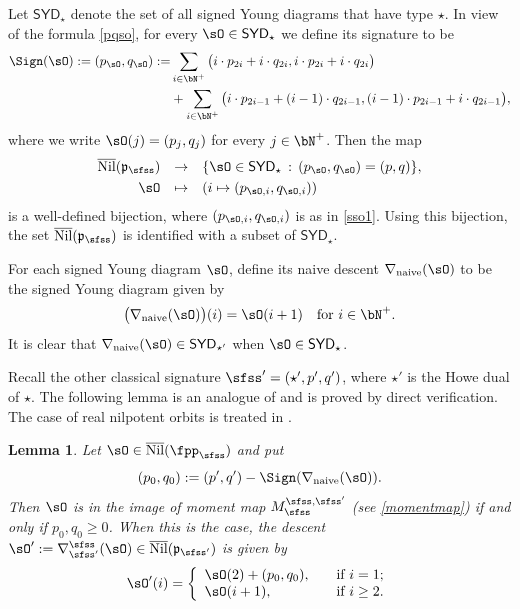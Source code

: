 \documentclass[11pt,a4paper]{amsart}
\def\SYD{{\mathsf{SYD}}}
\newcommand{\p}{\mathfrak p}
\def\DD{\nabla}
\newcommand{\be}{\begin {equation}}
\newcommand{\ee}{\end {equation}}
\numberwithin{equation}{section}
\newtheorem{lem}[thm]{Lemma}
\theoremstyle{remark}
\def\Nil{\overline{\mathrm{Nil}}}
\def\DDn{\DD_{\mathrm{naive}}}
\def\SYD{{\mathsf{SYD}}}
\begin{document}
Let $\SYD_{\star}$ denote the set of all signed Young diagrams that have type $\star$. 
In view of the formula \eqref{pqso}, for every $\sO\in \SYD_{\star}$ we define its signature to be
\be\label{signso}
  \begin{split}
    \Sign(\sO) :=(p_\sO,q_\sO):= &
    \sum_{i\in \bN^{+}} \big(i \cdot p_{2i} + i \cdot q_{2i},
    i \cdot p_{2i}+i\cdot q_{2i}\big)\\
    &  +
    \sum_{i\in \bN^{+}} \big(i \cdot p_{2i-1} + (i-1)\cdot q_{2i-1},
    (i-1) \cdot p_{2i-1}+i \cdot q_{2i-1}\big),
  \end{split}
\ee
where we write $\sO(j)=( p_{j},q_{j})$ for every $j\in \bN^+$.
Then the map
\begin{equation}\label{SYDO}
  \begin{array}{rcl}
  \Nil(\p_{\sfss})&\rightarrow& \{\sO\in \SYD_\star\,:\, (p_\sO, q_\sO)=(p,q)\}, \smallskip\\
  \sO&\mapsto& \left(i\mapsto (p_{\sO,i}, q_{\sO,i})\right)
  \end{array}
\end{equation}
is a well-defined bijection, where $(p_{\sO,i}, q_{\sO,i})$ is as in \eqref{sso1}. 
 Using this bijection, the set $\Nil(\p_{\sfss})$ is  identified with a subset of $\SYD_\star$. 

For each signed Young diagram 
$\sO$, define its naive descent $\DDn(\sO)$ to be the signed Young diagram given by
\be\label{naivedso}
\big(\DDn(\sO)\big)(i) = \sO(i+1) \quad \text{for } i \in \bN^+.
\ee
It is clear that $\DDn(\sO)\in
\SYD_{\star'}$ when $\sO\in
\SYD_{\star}$.

Recall the other classical signature $\sfss'=(\star', p',q')$, where  $\star'$ is the Howe dual of $\star$. 
The following lemma is an analogue of  and is proved by direct verification. The case of real nilpotent orbits is treated in \cite[Section 3.2]{Zh}.  

\begin{lem}\label{prop:DDss}
Let  $\sO\in \Nil(\fpps)$ and put 
\begin{equation}\label{eq:DDss1}
  (p_0,q_0):= (p',q') - \Sign(\DDn(\sO)). 
\end{equation}
Then $\sO$
is in the
image of moment map $M_\sfss^{\sfss, \sfss'}$ (see \eqref{momentmap}) if and only if $p_0,q_0\geq 0$. 
When this is the case,   the descent $\sO' := \DDss(\sO)\in \Nil(\p_{\sfss'})$
is given  by
\[
\sO'(i)=
\left\{\begin{array}{ll}
  \sO(2)+(p_0,q_0),\quad& \textrm{if $i=1$};\\
  \sO(i+1),\quad& \textrm{if $i\geq 2$}.
  \end{array}
  \right.
  \]
\end{lem}
\end{document}
